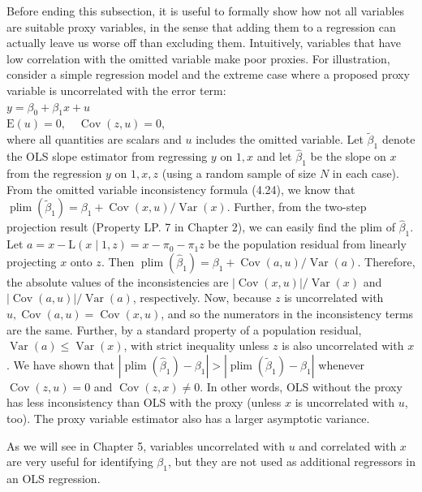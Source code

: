\documentclass[10pt]{article}
\begin{document}
Before ending this subsection, it is useful to formally show how not all variables are suitable proxy variables, in the sense that adding them to a regression can actually leave us worse off than excluding them. Intuitively, variables that have low correlation with the omitted variable make poor proxies. For illustration, consider a simple regression model and the extreme case where a proposed proxy variable is uncorrelated with the error term:\\
$y=\beta_{0}+\beta_{1} x+u$\\
$\mathrm{E}(u)=0, \quad \operatorname{Cov}(z, u)=0$,\\
where all quantities are scalars and $u$ includes the omitted variable. Let $\tilde{\beta}_{1}$ denote the OLS slope estimator from regressing $y$ on $1, x$ and let $\hat{\beta}_{1}$ be the slope on $x$ from the regression $y$ on $1, x, z$ (using a random sample of size $N$ in each case). From the omitted variable inconsistency formula (4.24), we know that $\operatorname{plim}\left(\tilde{\beta}_{1}\right)=\beta_{1}+ \operatorname{Cov}(x, u) / \operatorname{Var}(x)$. Further, from the two-step projection result (Property LP. 7 in Chapter 2), we can easily find the plim of $\hat{\beta}_{1}$. Let $a=x-\mathrm{L}(x \mid 1, z)=x-\pi_{0}-\pi_{1} z$ be the population residual from linearly projecting $x$ onto $z$. Then $\operatorname{plim}\left(\hat{\beta}_{1}\right)= \beta_{1}+\operatorname{Cov}(a, u) / \operatorname{Var}(a)$. Therefore, the absolute values of the inconsistencies are $|\operatorname{Cov}(x, u)| / \operatorname{Var}(x)$ and $|\operatorname{Cov}(a, u)| / \operatorname{Var}(a)$, respectively. Now, because $z$ is uncorrelated with $u, \operatorname{Cov}(a, u)=\operatorname{Cov}(x, u)$, and so the numerators in the inconsistency terms are the same. Further, by a standard property of a population residual, $\operatorname{Var}(a) \leq \operatorname{Var}(x)$, with strict inequality unless $z$ is also uncorrelated with $x$. We have shown that $\left|\operatorname{plim}\left(\hat{\beta}_{1}\right)-\beta_{1}\right|>\left|\operatorname{plim}\left(\tilde{\beta}_{1}\right)-\beta_{1}\right|$ whenever $\operatorname{Cov}(z, u)=0$ and $\operatorname{Cov}(z, x) \neq 0$. In other words, OLS without the proxy has less inconsistency than OLS with the proxy (unless $x$ is uncorrelated with $u$, too). The proxy variable estimator also has a larger asymptotic variance.

As we will see in Chapter 5, variables uncorrelated with $u$ and correlated with $x$ are very useful for identifying $\beta_{1}$, but they are not used as additional regressors in an OLS regression.
\end{document}
